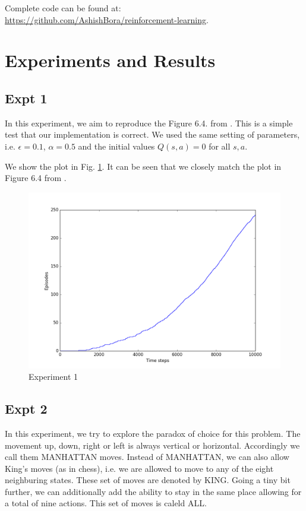 \documentclass{article}
\begin{document}
Complete code can be found at: \\ \url{https://github.com/AshishBora/reinforcement-learning}.


\section{Experiments and Results} \label{expt}

\subsection{Expt 1}
    In this experiment, we aim to reproduce the Figure 6.4. from \cite{RLbook}. This is a simple test that our implementation is correct. We used the same setting of parameters, i.e. $\epsilon = 0.1$,  $\alpha = 0.5$ and the initial values $Q(s, a) = 0$ for all $s, a$.    
    
    We show the plot in Fig. \ref{fig:expt1}. It can be seen that we closely match the plot in Figure 6.4 from \cite{RLbook}.
    
    \begin{figure}[!h]
        \centering
        \includegraphics[width=\textwidth]{expt1}
        \caption{Experiment 1}
        \label{fig:expt1}
    \end{figure}

\subsection{Expt 2}
    In this experiment, we try to explore the paradox of choice for this problem.
    The movement up, down, right or left is always vertical or horizontal. Accordingly we call them MANHATTAN moves. Instead of MANHATTAN, we can also allow King's moves (as in chess), i.e. we are allowed to move to any of the eight neighburing states. These set of moves are denoted by KING. Going a tiny bit further, we can additionally add the ability to stay in the same place allowing for a total of nine actions. This set of moves is caleld ALL.
\end{document}
